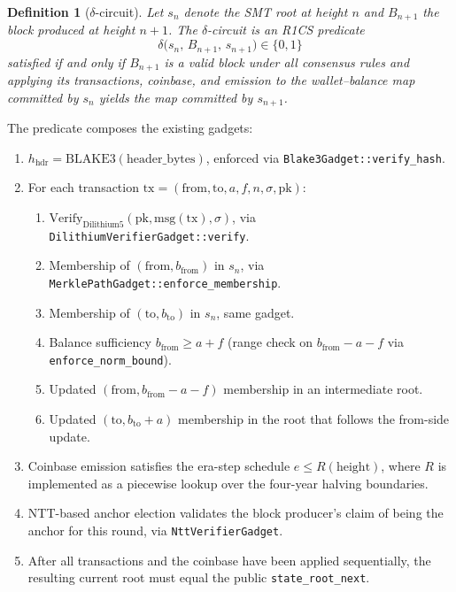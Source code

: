 \documentclass[11pt,a4paper]{article}
\newtheorem{definition}{Definition}
\begin{document}
\begin{definition}[$\delta$-circuit]
\label{def:deltacircuit}
Let $s_{n}$ denote the SMT root at height $n$ and $B_{n+1}$ the block
produced at height $n+1$. The $\delta$-circuit is an R1CS predicate
\[
  \delta\big(s_n,\, B_{n+1},\, s_{n+1}\big) \in \{0,1\}
\]
satisfied if and only if $B_{n+1}$ is a valid block under all
consensus rules and applying its transactions, coinbase, and emission
to the wallet--balance map committed by $s_n$ yields the map committed
by $s_{n+1}$.
\end{definition}

The predicate composes the existing gadgets:

\begin{enumerate}[leftmargin=*]
  \item $h_{\mathrm{hdr}} = \mathrm{BLAKE3}(\mathrm{header\_bytes})$,
        enforced via \texttt{Blake3Gadget::verify\_hash}.
  \item For each transaction $\mathrm{tx} = (\mathrm{from}, \mathrm{to}, a, f, n, \sigma, \mathrm{pk})$:
        \begin{enumerate}[label*=(\alph*),leftmargin=*]
          \item $\mathrm{Verify}_{\mathrm{Dilithium5}}(\mathrm{pk}, \mathrm{msg}(\mathrm{tx}), \sigma)$,
                via \texttt{DilithiumVerifierGadget::verify}.
          \item Membership of $(\mathrm{from}, b_{\mathrm{from}})$ in $s_n$, via
                \texttt{MerklePathGadget::enforce\_membership}.
          \item Membership of $(\mathrm{to}, b_{\mathrm{to}})$ in $s_n$, same gadget.
          \item Balance sufficiency $b_{\mathrm{from}} \ge a + f$
                (range check on $b_{\mathrm{from}} - a - f$ via \texttt{enforce\_norm\_bound}).
          \item Updated $(\mathrm{from}, b_{\mathrm{from}} - a - f)$ membership in
                an intermediate root.
          \item Updated $(\mathrm{to}, b_{\mathrm{to}} + a)$ membership in the
                root that follows the from-side update.
        \end{enumerate}
  \item Coinbase emission satisfies the era-step schedule
        $e \le R(\mathrm{height})$, where $R$ is implemented as a piecewise
        lookup over the four-year halving boundaries.
  \item NTT-based anchor election validates the block producer's claim
        of being the anchor for this round, via \texttt{NttVerifierGadget}.
  \item After all transactions and the coinbase have been applied
        sequentially, the resulting current root must equal the public
        \texttt{state\_root\_next}.
\end{enumerate}
\end{document}
